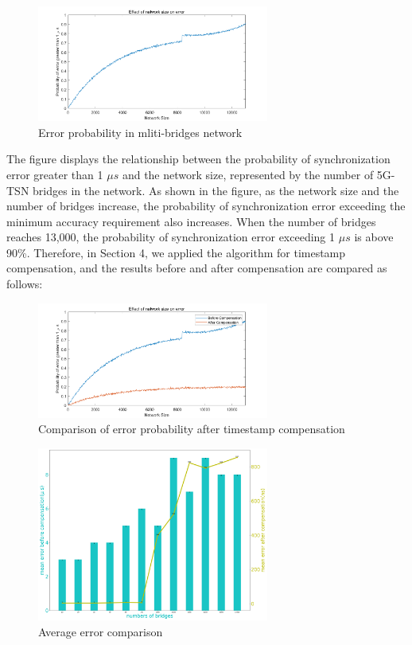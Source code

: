 \documentclass[english]{cccconf}
\begin{document}
\begin{figure}[htbp]
	\centering
	\setcounter{figure}{6}
	\includegraphics[width=3in]{fig25.png}
	\caption{Error probability in mliti-bridges network}
\end{figure}
The figure displays the relationship between the probability of synchronization error greater than 1 $\mu s$ and the network size, represented by the number of 5G-TSN bridges in the network. As shown in the figure, as the network size and the number of bridges increase, the probability of synchronization error exceeding the minimum accuracy requirement also increases. When the number of bridges reaches 13,000, the probability of synchronization error exceeding 1 $\mu s$ is above 90\%. Therefore, in Section 4, we applied the algorithm for timestamp compensation, and the results before and after compensation are compared as follows:
\begin{figure}[htbp]
	\centering
	\setcounter{figure}{7}
	\includegraphics[width=3in]{fig24.png}
	\caption{Comparison of error probability after timestamp compensation }
\end{figure}
\begin{figure}[htbp]
	\centering
	\setcounter{figure}{8}
	\includegraphics[width=3in]{fig23.png}
	\caption{Average error comparison}
\end{figure}
\end{document}

